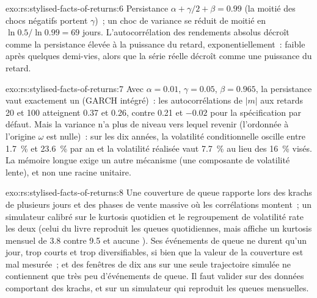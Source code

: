 \begin{solution}{exo:rs:stylised-facts-of-returns:6}
Persistance $\alpha + \gamma/2 + \beta = 0.99$ (la moitié des chocs négatifs portent $\gamma$)~; un choc de variance se réduit de moitié en $\ln 0.5/\ln 0.99 = 69$
jours. L'autocorrélation des rendements absolus décroît comme la persistance élevée à la puissance du retard, exponentiellement~: faible après quelques
demi-vies, alors que la série réelle décroît comme une puissance du retard.
\end{solution}

\begin{solution}{exo:rs:stylised-facts-of-returns:7}
Avec $\alpha = 0.01$, $\gamma = 0.05$, $\beta = 0.965$, la persistance vaut exactement un (GARCH intégré)~: les autocorrélations de $|m|$
aux retards 20 et 100 atteignent 0.37 et 0.26, contre 0.21 et $-0.02$ pour la spécification par défaut. Mais la variance n'a plus de niveau vers lequel revenir
(l'ordonnée à l'origine $\omega$ est nulle)~: sur les dix années, la volatilité conditionnelle oscille entre 1.7~\% et 23.6~\% par an et la
volatilité réalisée vaut 7.7~\% au lieu des 16~\% visés. La mémoire longue exige un autre mécanisme (une composante de volatilité lente), et non une
racine unitaire.
\end{solution}

\begin{solution}{exo:rs:stylised-facts-of-returns:8}
Une couverture de queue rapporte lors des krachs de plusieurs jours et des phases de vente massive où les corrélations montent~; un simulateur calibré sur le kurtosis quotidien et
le regroupement de volatilité rate les deux (celui du livre reproduit les queues quotidiennes, mais affiche un kurtosis mensuel de 3.8 contre 9.5 et aucune ). Ses
événements de queue ne durent qu'un jour, trop courts et trop diversifiables, si bien que la valeur de la couverture est mal mesurée~; et des fenêtres de dix ans sur une seule
trajectoire simulée ne contiennent que très peu d'événements de queue. Il faut valider sur des données comportant des krachs, et sur un simulateur qui reproduit les queues mensuelles.
\end{solution}

